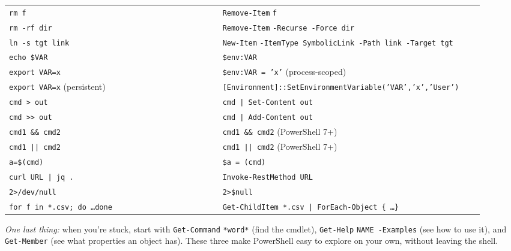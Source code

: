 \documentclass[11pt,a4paper]{article}
\newcommand{\cmd}[1]{\texttt{\textcolor{pwshKw}{#1}}}
\newcommand{\bcmd}[1]{\texttt{\textcolor{bashKw}{#1}}}
\begin{document}
\begin{center}
\begin{tabular}{p{0.42\linewidth} p{0.50\linewidth}}
\bcmd{rm f}                              & \cmd{Remove-Item} \texttt{f} \\
\bcmd{rm -rf dir}                        & \cmd{Remove-Item} \texttt{-Recurse -Force dir} \\
\bcmd{ln -s tgt link}                    & \cmd{New-Item} \texttt{-ItemType SymbolicLink -Path link -Target tgt} \\
\bcmd{echo \$VAR}                        & \texttt{\$env:VAR} \\
\bcmd{export VAR=x}                      & \texttt{\$env:VAR = 'x'} \quad (process-scoped) \\
\bcmd{export VAR=x} (persistent)          & \texttt{[Environment]::SetEnvironmentVariable('VAR','x','User')} \\
\bcmd{cmd > out}                          & \texttt{cmd | \cmd{Set-Content} out} \\
\bcmd{cmd >> out}                         & \texttt{cmd | \cmd{Add-Content} out} \\
\bcmd{cmd1 \&\& cmd2}                     & \texttt{cmd1 \&\& cmd2} \quad (PowerShell 7+) \\
\bcmd{cmd1 || cmd2}                       & \texttt{cmd1 || cmd2} \quad (PowerShell 7+) \\
\bcmd{a=\$(cmd)}                          & \texttt{\$a = (cmd)} \\
\bcmd{curl URL | jq .}                    & \texttt{\cmd{Invoke-RestMethod} URL} \\
\bcmd{2>/dev/null}                        & \texttt{2>\$null} \\
\bcmd{for f in *.csv; do \dots done}      & \texttt{\cmd{Get-ChildItem} *.csv | \cmd{ForEach-Object} \{ \dots \}} \\
\bottomrule
\end{tabular}
\end{center}

\vspace{1em}
\noindent\textit{One last thing:} when you're stuck, start with
\cmd{Get-Command} \texttt{*word*} (find the cmdlet), \cmd{Get-Help}
\texttt{NAME -Examples} (see how to use it), and \cmd{Get-Member}
(see what properties an object has). These three make PowerShell easy
to explore on your own, without leaving the shell.
\end{document}
